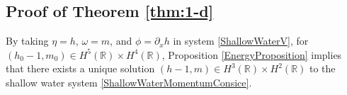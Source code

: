 \documentclass[reqno,11pt]{amsart}
\newcommand{\norm}[2]{\Vert #1 \Vert_{#2}}
\theoremstyle{plain}
\theoremstyle{definition}
\numberwithin{equation}{section}
\begin{document}
\subsection{Proof of Theorem \ref{thm:1-d}}
By taking $\eta=h$, $\omega=m$, and $\phi=\partial_x h$ in system \eqref{ShallowWaterV}, for $(h_0-1,m_0)\in H^5(\mathbb{R})\times H^4(\mathbb{R})$, Proposition \ref{EnergyProposition} implies that there exists a unique solution $ (h-1, m)\in H^3(\mathbb{R})\times H^2(\mathbb{R}) $ to the shallow water system \eqref{ShallowWaterMomentumConsice}.
\end{document}
